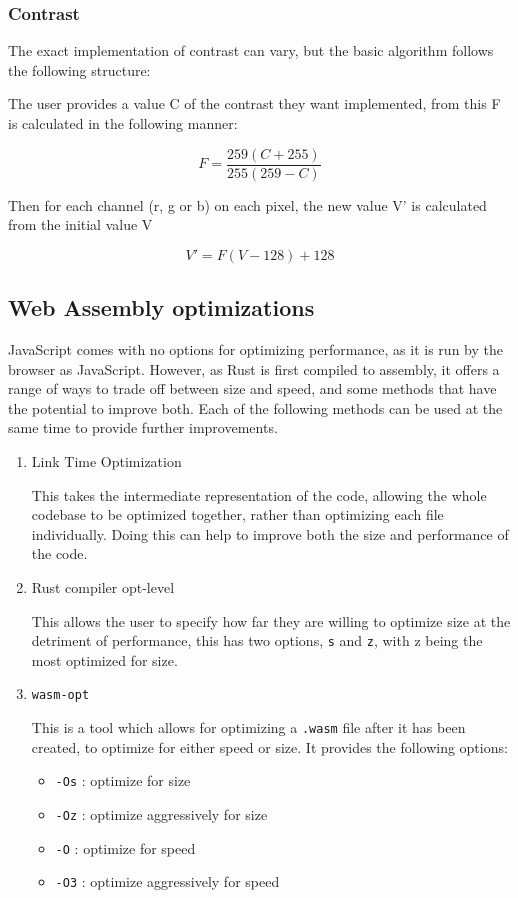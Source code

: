 \documentclass[12pt,a4paper]{article}
\begin{document}
\subsubsection{Contrast}

The exact implementation of contrast can vary, but the basic algorithm follows the following structure:

The user provides a value C of the contrast they want implemented, from this F is calculated in the following manner:

$$
    F=\frac{259(C+255)}{255(259-C)}
$$

Then for each channel (r, g or b) on each pixel, the new value V' is calculated from the initial value V

$$
    V'=F(V-128)+128
$$

\subsection{Web Assembly optimizations}

JavaScript comes with no options for optimizing performance, as it is run by the browser as JavaScript. However, as Rust is first compiled to assembly, it offers a range of ways to trade off between size and speed, and some methods that have the potential to improve both. Each of the following methods can be used at the same time to provide further improvements.

\begin{enumerate}
    \item Link Time Optimization

          This takes the intermediate representation of the code, allowing the whole codebase to be optimized together, rather than optimizing each file individually. Doing this can help to improve both the size and performance of the code.

    \item Rust compiler opt-level

          This allows the user to specify how far they are willing to optimize size at the detriment of performance, this has two options, \texttt{s} and \texttt{z}, with z being the most optimized for size.

    \item \texttt{wasm-opt}

          This is a tool which allows for optimizing a \texttt{.wasm} file after it has been created, to optimize for either speed or size. It provides the following options:

          \begin{itemize}
              \item \texttt{-Os} : optimize for size
              \item \texttt{-Oz} : optimize aggressively for size
              \item \texttt{-O} : optimize for speed
              \item \texttt{-O3} : optimize aggressively for speed
          \end{itemize}

\end{enumerate}
\end{document}
